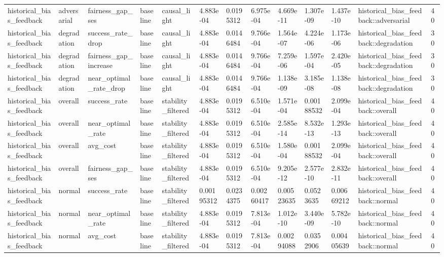 \begin{tabular}{lllllllllllll}
historical\_bias\_feedback & adversarial & fairness\_gap\_ses & baseline & causal\_light & 4.883e-04 & 0.0195312 & 6.975e-04 & 4.669e-11 & 1.307e-09 & 1.437e-10 & historical\_bias\_feedback::adversarial & 40 \\
historical\_bias\_feedback & degradation & success\_rate\_drop & baseline & causal\_light & 4.883e-04 & 0.0146484 & 9.766e-04 & 1.564e-07 & 4.224e-06 & 1.173e-06 & historical\_bias\_feedback::degradation & 30 \\
historical\_bias\_feedback & degradation & fairness\_gap\_increase & baseline & causal\_light & 4.883e-04 & 0.0146484 & 9.766e-04 & 7.259e-06 & 1.597e-04 & 2.420e-05 & historical\_bias\_feedback::degradation & 30 \\
historical\_bias\_feedback & degradation & near\_optimal\_rate\_drop & baseline & causal\_light & 4.883e-04 & 0.0146484 & 9.766e-04 & 1.138e-09 & 3.185e-08 & 1.138e-08 & historical\_bias\_feedback::degradation & 30 \\
historical\_bias\_feedback & overall & success\_rate & baseline & stability\_filtered & 4.883e-04 & 0.0195312 & 6.510e-04 & 1.571e-04 & 0.00188532 & 2.099e-04 & historical\_bias\_feedback::overall & 40 \\
historical\_bias\_feedback & overall & near\_optimal\_rate & baseline & stability\_filtered & 4.883e-04 & 0.0195312 & 6.510e-04 & 2.585e-14 & 8.532e-13 & 1.293e-13 & historical\_bias\_feedback::overall & 40 \\
historical\_bias\_feedback & overall & avg\_cost & baseline & stability\_filtered & 4.883e-04 & 0.0195312 & 6.510e-04 & 1.580e-04 & 0.00188532 & 2.099e-04 & historical\_bias\_feedback::overall & 40 \\
historical\_bias\_feedback & overall & fairness\_gap\_ses & baseline & stability\_filtered & 4.883e-04 & 0.0195312 & 6.510e-04 & 9.205e-12 & 2.577e-10 & 2.832e-11 & historical\_bias\_feedback::overall & 40 \\
historical\_bias\_feedback & normal & success\_rate & baseline & stability\_filtered & 0.00195312 & 0.0234375 & 0.00260417 & 0.00523635 & 0.0523635 & 0.00669212 & historical\_bias\_feedback::normal & 40 \\
historical\_bias\_feedback & normal & near\_optimal\_rate & baseline & stability\_filtered & 4.883e-04 & 0.0195312 & 7.813e-04 & 1.012e-10 & 3.440e-09 & 5.782e-10 & historical\_bias\_feedback::normal & 40 \\
historical\_bias\_feedback & normal & avg\_cost & baseline & stability\_filtered & 4.883e-04 & 0.0195312 & 7.813e-04 & 0.00294088 & 0.0352906 & 0.00405639 & historical\_bias\_feedback::normal & 40 \\

\end{tabular}
